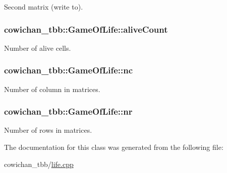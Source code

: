 Second matrix (write to). \hypertarget{classcowichan__tbb_1_1_game_of_life_ad536d79679edcb0c5946bb9b0464e4a}{
\subsubsection[{aliveCount}]{ {\bf cowichan\_\-tbb::GameOfLife::aliveCount}}}
\label{classcowichan__tbb_1_1_game_of_life_ad536d79679edcb0c5946bb9b0464e4a}


Number of alive cells. \hypertarget{classcowichan__tbb_1_1_game_of_life_e7584561d427c5f4922853deda9b402f}{
\subsubsection[{nc}]{ {\bf cowichan\_\-tbb::GameOfLife::nc}}}
\label{classcowichan__tbb_1_1_game_of_life_e7584561d427c5f4922853deda9b402f}


Number of column in matrices. \hypertarget{classcowichan__tbb_1_1_game_of_life_570da56c471fa8c5f2c83e572775f75e}{
\subsubsection[{nr}]{ {\bf cowichan\_\-tbb::GameOfLife::nr}}}
\label{classcowichan__tbb_1_1_game_of_life_570da56c471fa8c5f2c83e572775f75e}


Number of rows in matrices. 

The documentation for this class was generated from the following file:\begin{CompactItemize}
\item 
cowichan\_\-tbb/\hyperlink{cowichan__tbb_2life_8cpp}{life.cpp}\end{CompactItemize}

